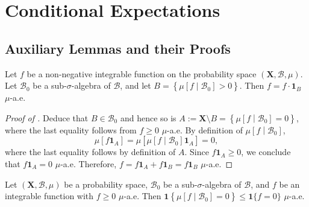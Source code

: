 
\section{Conditional Expectations}

\subsection{Auxiliary Lemmas and their Proofs}

\begin{lemma}
\label{lem--nonneg-f-equal-cond-exp-pos-prodf}
Let \(f\) be a non-negative integrable function on the probability space
\((\mathbf{X}, \mathcal{B}, \mu)\).
Let \(\mathcal{B}_{0}\) be a sub-\(\sigma\)-algebra of \(\mathcal{B}\), and
let \(B = \left\{ \mu \left[ f \middle| \mathcal{B}_{0} \right] > 0 \right\}\).
Then \(f = f \cdot \mathbf{1}_{B}\)
\(\mu\)-a.e.
\end{lemma}

\begin{proof}[Proof of ]
Deduce that \(B \in \mathcal{B}_{0}\) and hence so is \(A := \mathbf{X}
\setminus B = \left\{ \mu \left[ f \middle| \mathcal{B}_{0}
\right] = 0 \right\}\), where the last equality follows from \(f \geq 0\)
\(\mu\)-a.e.
By definition of \(\mu \left[ f \middle| \mathcal{B}_{0} \right]\),
\begin{equation*}
  \mu \left[ f \mathbf{1}_{A} \right] = \mu \left[ \mu \left[ f \middle|
  \mathcal{B}_{0} \right] \mathbf{1}_{A} \right] = 0,
\end{equation*}
where the last equality follows by definition of \(A\).
Since \(f \mathbf{1}_{A} \geq 0\), we conclude that \(f \mathbf{1}_{A} = 0\)
\(\mu\)-a.e.
Therefore, \(f = f \mathbf{1}_{A} + f \mathbf{1}_{B} = f \mathbf{1}_{B}\)
\(\mu\)-a.e.
\end{proof}

\begin{lemma}
\label{lem--nonneg-f-cond-exp-null-subsets}
Let \((\mathbf{X}, \mathcal{B}, \mu)\) be a probability space,
\(\mathcal{B}_{0}\) be a sub-\(\sigma\)-algebra of \(\mathcal{B}\),
and \(f\) be an integrable function with \(f \geq 0\) \(\mu\)-a.e.
Then \(\mathbf{1} \left\{ \mu \left[ f \middle| \mathcal{B}_{0}
\right] = 0 \right\} \leq \mathbf{1} \{f = 0\}\) \(\mu\)-a.e.
\end{lemma}

